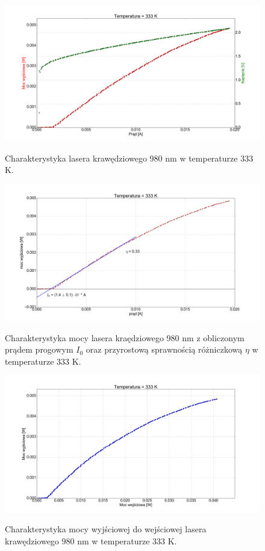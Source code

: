 \documentclass[a4paper, portrait,12pt]{report}
\begin{document}
\begin{figure}
\center
  \includegraphics[scale=0.30]{plot980/temp_60_IVL.png}
  \label{rys1}
  \caption{Charakterystyka lasera krawędziowego 980 nm w temperaturze 333 K.} 
\end{figure}

\begin{figure}
\center
  \includegraphics[scale=0.30]{plot980/temp_60_fit.png}
  \label{rys1}
  \caption{Charakterystyka mocy lasera kraędziowego 980 nm z obliczonym prądem progowym $I_0$ oraz przyrostową sprawnością różniczkową $\eta$ w temperaturze 333 K.} 
\end{figure}

\clearpage
\begin{figure}
\center
  \includegraphics[scale=0.30]{plot980/temp_60_power.png}
  \label{rys1}
  \caption{Charakterystyka mocy wyjściowej do wejściowej lasera krawędziowego 980 nm w temperaturze 333 K.} 
\end{figure}
\end{document}
